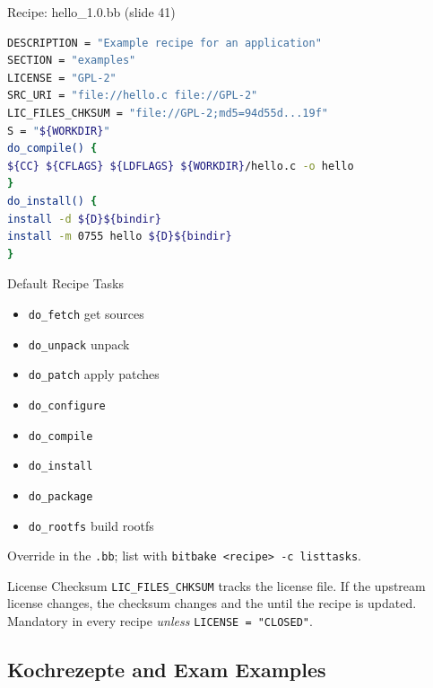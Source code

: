 \begin{minipage}{0.6\linewidth}
\begin{examplecode}{Recipe: hello\_1.0.bb (slide 41)}
\begin{lstlisting}[language=bash, style=basesmol, aboveskip=2pt, belowskip=2pt]
DESCRIPTION = "Example recipe for an application"
SECTION = "examples"
LICENSE = "GPL-2"
SRC_URI = "file://hello.c file://GPL-2"
LIC_FILES_CHKSUM = "file://GPL-2;md5=94d55d...19f"
S = "${WORKDIR}"
do_compile() {
${CC} ${CFLAGS} ${LDFLAGS} ${WORKDIR}/hello.c -o hello
}
do_install() {
install -d ${D}${bindir}
install -m 0755 hello ${D}${bindir}
}
\end{lstlisting}
\end{examplecode}
\end{minipage}
\begin{minipage}{0.39\linewidth}
\begin{corollary}{Default Recipe Tasks}
    \begin{itemize}
        \item \texttt{do\_fetch} get sources
        \item \texttt{do\_unpack} unpack
        \item \texttt{do\_patch} apply patches
        \item \texttt{do\_configure}
        \item \texttt{do\_compile}
        \item \texttt{do\_install}
        \item \texttt{do\_package}
        \item \texttt{do\_rootfs} build rootfs
    \end{itemize}
    Override in the \texttt{.bb}; list with \texttt{bitbake <recipe> -c listtasks}.
\end{corollary}
\end{minipage}

\begin{remark2}{License Checksum}
    \texttt{LIC\_FILES\_CHKSUM} tracks the license file. If the upstream license
    changes, the checksum changes and the  until the recipe
    is updated. Mandatory in every recipe \emph{unless} \texttt{LICENSE = "CLOSED"}.
\end{remark2}




\subsection{Kochrezepte and Exam Examples}

